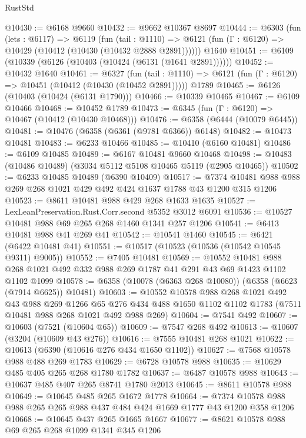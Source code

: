 \begin{lexlean}{RustStd}
\begin{coremodule}
@10430 := @6168 @9660
@10432 := @9662 @10367 @8697
@10444 := @6303
    (fun (lets : @6117) =>
    @6119
      (fun (tail : @1110) =>
      @6121 (fun (Γ : @6120) => @10429 (@10412 (@10430 (@10432 @2888 @2891))))))
    @1640
@10451 := @6109 (@10339 (@6126 (@10403 (@10424 (@6131 (@1641 @2891))))))
@10452 := @10432 @1640
@10461 := @6327
    (fun (tail : @1110) => @6121 (fun (Γ : @6120) => @10451 (@10412 (@10430 (@10452 @2891)))))
    @1789
@10465 := @6126 (@10403 (@10424 (@6131 @1790)))
@10466 := @10339 @10465
@10467 := @6109 @10466
@10468 := @10452 @1789
@10473 := @6345 (fun (Γ : @6120) => @10467 (@10412 (@10430 @10468)))
@10476 := @6358 (@6444 (@10079 @6445))
@10481 := @10476 (@6358 (@6361 (@9781 @6366)) @6148)
@10482 := @10473 @10481
@10483 := @6233 @10466
@10485 := @10410 (@6160 @10481)
@10486 := @6109 @10485
@10489 := @6167 @10481 @9660 @10468
@10498 := @10483 (@10486 @10489) (@3034 @5112 @5108 @10465 @5119 (@2905 @10465))
@10502 := @6233 @10485 @10489 (@6390 @10409)
@10517 := @7374 @10481 @988 @988 @269 @268 @1021 @429 @492 @424 @1637 @1788 @43 @1200 @315 @1206
@10523 := @8611 @10481 @988 @429 @268 @1633 @1635
@10527 := LexLeanPreservation.Rust.Corr.second @5352 @3012 @6091
@10536 := @10527 @10481 @988 @69 @265 @268 @1460 @1341 @257 @1206
@10541 := @6413 @10481 @988 @41 @269 @41
@10542 := @10541 @1460
@10545 := @6421 (@6422 @10481 @41)
@10551 := @10517 (@10523 (@10536 (@10542 @10545 @9311) @9005))
@10552 := @7405 @10481
@10569 := @10552
    @10481
    @988
    @268
    @1021
    @492
    @332
    @988
    @269
    @1787
    @41
    @291
    @43
    @69
    @1423
    @1102
    @1102
    @1099
@10578 := @6358 (@10078 (@6363 @268 @10080)) (@6358 (@6623 (@7914 @6625)) @10481)
@10603 := @10552
    @10578
    @988
    @268
    @1021
    @492
    @43
    @988
    @269
    @1266
    @65
    @276
    @434
    @488
    @1650
    @1102
    @1102
    @1783
    (@7511 @10481 @988 @268 @1021 @492 @988 @269)
@10604 := @7541 @492
@10607 := @10603 (@7521 (@10604 @65))
@10609 := @7547 @268 @492
@10613 := @10607 (@3204 (@10609 @43 @276))
@10616 := @7555 @10481 @268 @1021
@10622 := @10613 (@6390 (@10616 @276 @434 @1650 @1102))
@10627 := @7568 @10578 @988 @488 @269 @1783
@10629 := @6728 @10578 @988
@10635 := @10629 @485 @405 @265 @268 @1780 @1782
@10637 := @6487 @10578 @988
@10643 := @10637 @485 @407 @265 @8741 @1780 @2013
@10645 := @8611 @10578 @988
@10649 := @10645 @485 @265 @1672 @1778
@10664 := @7374 @10578 @988 @988 @265 @265 @988 @437 @484 @424 @1669 @1777 @43 @1200 @358 @1206
@10668 := @10645 @437 @265 @1665 @1667
@10677 := @8621 @10578 @988 @69 @265 @268 @1099 @1341 @345 @1206

\end{coremodule}
\end{lexlean}
